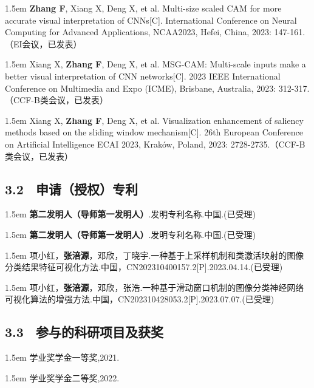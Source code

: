 \hangindent 1.5em
\noindent
[1] \textbf{Zhang F}, Xiang X, Deng X, et al. Multi-size scaled CAM for more accurate visual interpretation of CNNs[C]. International Conference on Neural Computing for Advanced Applications, NCAA2023, Hefei, China, 2023: 147-161.（EI会议，已发表）

\hangindent 1.5em
\noindent
[2] Xiang X, \textbf{Zhang F}, Deng X, et al. MSG-CAM: Multi-scale inputs make a better visual interpretation of CNN networks[C]. 2023 IEEE International Conference on Multimedia and Expo (ICME), Brisbane, Australia, 2023: 312-317.（CCF-B类会议，已发表）

\hangindent 1.5em
\noindent
[3] Xiang X, \textbf{Zhang F}, Deng X, et al. Visualization enhancement of saliency methods based on the sliding window mechanism[C]. 26th European Conference on Artificial Intelligence ECAI 2023, Kraków, Poland, 2023: 2728-2735.（CCF-B类会议，已发表）

\fi

\subsection{3.2 \ 申请（授权）专利}

\ifAnonymity

\hangindent 1.5em
\noindent
[1]\textbf{第二发明人（导师第一发明人）}.发明专利名称.中国.(已受理)

\hangindent 1.5em
\noindent
[1]\textbf{第二发明人（导师第一发明人）}.发明专利名称.中国.(已受理)

\else

\hangindent 1.5em
\noindent
[1]项小红，\textbf{张涪源}，邓欣，丁晓宇.一种基于上采样机制和类激活映射的图像分类结果特征可视化方法.中国，CN202310400157.2[P].2023.04.14.(已受理)

\hangindent 1.5em
\noindent
[2]项小红，\textbf{张涪源}，邓欣，张浩.一种基于滑动窗口机制的图像分类神经网络可视化算法的增强方法.中国，CN202310428053.2[P].2023.07.07.(已受理)

\fi

\ifAnonymity
\subsection{3.3 \ 参与的科研项目及获奖}
\hangindent 1.5em
\noindent
[1] 学业奖学金一等奖,2021.

\hangindent 1.5em
\noindent
[2] 学业奖学金二等奖,2022.

\fi








